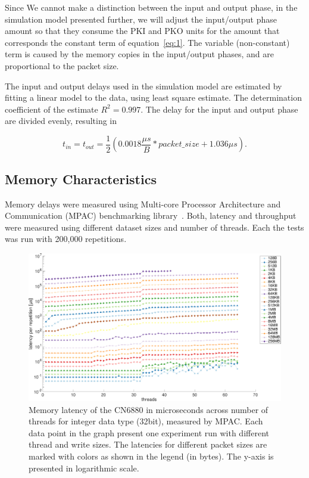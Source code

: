 Since We cannot make a distinction between the input and output phase, in the simulation model presented further, we will adjust the input/output phase amount so that they consume the PKI and PKO units for the amount that corresponds the constant term of equation~\ref{eq:1}. The variable (non-constant) term is caused by the memory copies in the input/output phases, and are proportional to the packet size.

The input and output delays used in the simulation model are estimated by fitting a linear model to the data, using least square estimate. The determination coefficient of the estimate $R^2 = 0.997$. The delay for the input and output phase are divided evenly, resulting in

\begin{equation}
  \label{eq:1}
  t_{in} = t_{out} = \frac{1}{2}(0.0018\frac{\mu s}{B} * packet\_size + 1.036\mu s).
\end{equation}

\subsection{Memory Characteristics}
\label{sec:memory-characteristics}

Memory delays were measured using Multi-core Processor Architecture and Communication (MPAC) benchmarking library~\cite{Jamal:2009:MPAC}. Both, latency and throughput were measured using different dataset sizes and number of threads. Each the tests was run with 200,000 repetitions.

\begin{figure}[]
  \begin{center}
    \includegraphics[width=\textwidth]{images/mem-latency.pdf}
    \caption{Memory latency of the CN6880 in microseconds across number of threads for integer data type (32bit), measured by MPAC. Each data point in the graph present one experiment run with different thread and write sizes. The latencies for different packet sizes are marked with colors as shown in the legend (in bytes). The y-axis is presented in logarithmic scale.}
    \label{fig:mem-latency}
  \end{center}
\end{figure}

